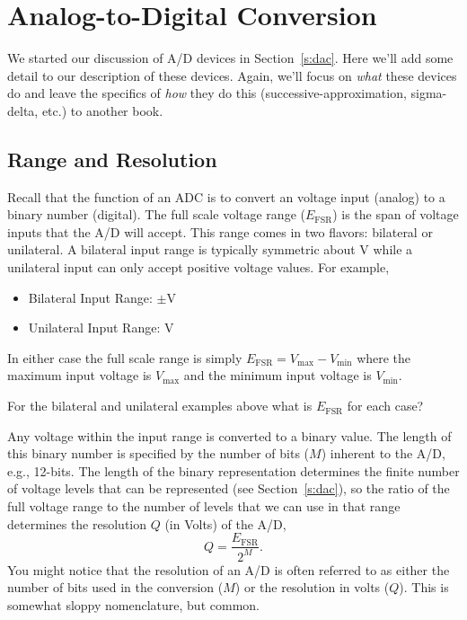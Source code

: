 \section{Analog-to-Digital Conversion}
We started our discussion of A/D devices in Section~\ref{s:dac}.  Here we'll add some detail to our description of these devices.  Again, we'll focus on \emph{what} these devices do and leave the specifics of \emph{how} they do this (successive-approximation, sigma-delta, etc.) to another book.
\subsection{Range and Resolution}
Recall that the function of an ADC is to convert an voltage input (analog) to a binary number (digital).  The \gls{full scale voltage range} ($E_{\mathrm{FSR}}$) is the span of voltage inputs that the A/D will accept.  This range comes in two flavors: bilateral or unilateral.  A bilateral input range is typically symmetric about \unit[0]{V} while a unilateral input can only accept positive voltage values.  For example,
\begin{itemize}
\item Bilateral Input Range: $\pm$\unit[10]{V}
\item Unilateral Input Range: \unit[0--10]{V}
\end{itemize}
In either case the full scale range is simply $E_{\mathrm{FSR}}=V_{\mathrm{max}}-V_{\mathrm{min}}$ where the maximum input voltage is $V_{\mathrm{max}}$ and the minimum input voltage is $V_{\mathrm{min}}$.  
\begin{ex}
For the bilateral and unilateral examples above what is $E_{\mathrm{FSR}}$ for each case?
\end{ex}

Any voltage within the input range is converted to a binary value.  The length of this binary number is specified by the number of bits ($M$) inherent to the A/D, e.g., 12-bits.  The length of the binary representation determines the finite number of voltage levels that can be represented (see Section~\ref{s:dac}), so the ratio of the full voltage range to the number of levels that we can use in that range determines the resolution $Q$ (in Volts) of the A/D,
\begin{equation}
\label{e:q}
Q = \frac{E_{\mathrm{FSR}}}{2^M}.
\end{equation}
You might notice that the resolution of an A/D is often referred to as either the number of bits used in the conversion ($M$) or the resolution in volts ($Q$).  This is somewhat sloppy nomenclature, but common. 

